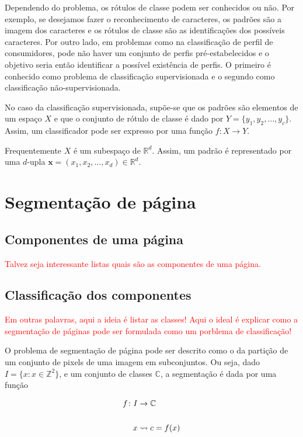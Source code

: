 \documentclass[a4paper,11pt]{article}
\newcommand{\TODO}[1]{\textcolor{red}{#1}}
\begin{document}
Dependendo do problema, os rótulos de classe podem ser conhecidos ou
não. Por exemplo, se desejamos fazer o reconhecimento de caracteres,
os padrões são a imagem dos caracteres e os rótulos de classe são as
identificações dos possíveis caracteres. Por outro lado, em problemas
como na classificação de perfil de consumidores, pode não haver um
conjunto de perfis pré-estabelecidos e o objetivo seria então
identificar a possível existência de perfis. O primeiro é conhecido
como problema de classificação supervisionada e o segundo como
classificação não-supervisionada.

No caso da classificação supervisionada, supõe-se que os padrões são
elementos de um espaço $X$ e que o conjunto de rótulo de classe é dado
por $Y=\{y_1,y_2,\ldots,y_c\}$. Assim, um classificador pode ser
expresso por uma função $f: X \to Y$.

Frequentemente $X$ é um subespaço de $\mathbb{R}^d$. Assim, um padrão
é representado por uma $d$-upla $\mathbf{x}=(x_1,x_2,\ldots,x_d) \in
\mathbb{R}^d$.


 



\section{Segmentação de página}


\subsection{Componentes de uma página}

\TODO{Talvez seja interessante listas quais são as componentes de uma
página.}


\subsection{Classificação dos componentes}

\TODO{Em outras palavras, aqui a ideia é listar as classes!}
\TODO{Aqui o ideal é explicar como a segmentação de páginas pode ser
  formulada como um porblema de classificação!}


O problema de segmentação de página pode ser descrito como o da
partição de um conjunto de pixels de uma imagem em subconjuntos. Ou
seja, dado $I = \lbrace x \colon x \in \mathbb{Z} ^ 2 \rbrace$, e um
conjunto de classes $\mathbb{C}$, a segmentação é dada por uma função

    \begin{equation}
      \begin{split}
        f \colon I &\to \mathbb{C}\\
        \cr x &\rightsquigarrow c = f(x)
      \end{split}
    \end{equation}
\end{document}

